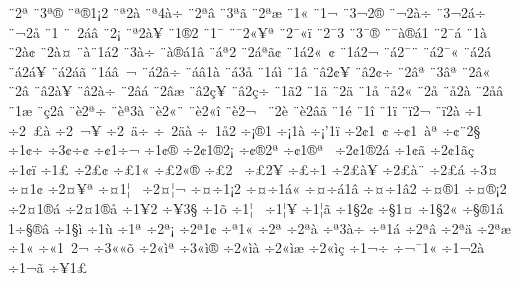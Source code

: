 {^^a82^^aa^^ad
^^a83^^aa^^ae
^^a8^^aa^^ae1^^a12
^^a8^^aa2^^e0
^^a8^^aa4^^e0^^f7
^^a82^^aa^^e2
^^a83^^aa^^e3
^^a82^^aa^^e6
^^a81^^ab
^^a81^^ac
^^a83^^ac2^^ad^^ae
^^a8^^ac2^^e0^^f7
^^a83^^ac2^^e1^^f7
^^a8^^ac2^^e5
^^a81^^ad
^^a8^^ad^^a02^^e1^^e2
^^a82^^ad^^a1
^^a8^^ad^^aa2^^e0^^a5
^^a81^^ae2
^^a81^^af
^^a8^^af2^^ab^^a5^^aa
^^a82^^af^^ab^^ef
^^a82^^af3^^ad
^^a83^^af^^ae
^^a8^^af^^e0^^ae^^e11
^^a82^^af^^e1
^^a81^^e0
^^a82^^e0^^a2
^^a82^^e0^^a4
^^a8^^e0^^a81^^e12
^^a83^^e0^^f7
^^a8^^e0^^ae^^e11^^e2
^^a8^^e1^^aa2
^^a82^^e1^^aa^^e3^^a2
^^a81^^e12^^ab^^a0^^a2
^^a81^^e12^^ac
^^a8^^e12^^af^^a8
^^a8^^e12^^af^^ab
^^a8^^e12^^e1^^a0
^^a8^^e12^^e1^^a5
^^a8^^e12^^e1^^e3
^^a81^^e1^^e2^^a0^^ac
^^a8^^e12^^e2^^f7^^ad
^^a8^^e1^^e21^^e0
^^a8^^e13^^e5
^^a81^^e1^^ec
^^a81^^e2
^^a8^^e22^^a2^^a5
^^a8^^e22^^a2^^f7
^^a82^^e2^^aa
^^a83^^e2^^aa^^ad
^^a82^^e2^^ab
^^a82^^e2^^ad
^^a8^^e22^^e0^^a5
^^a8^^e22^^e0^^f7
^^a82^^e2^^e1
^^a82^^e2^^e6
^^a8^^e22^^e7^^a5
^^a8^^e22^^e7^^f7
^^a81^^e32
^^a81^^e4
^^a82^^e4^^ad
^^a81^^e5
^^a8^^e52^^ab
^^a82^^e5^^ad
^^a8^^e52^^e0
^^a82^^e5^^e2
^^a81^^e6
^^a8^^e72^^e2
^^a8^^e82^^aa^^f7
^^a8^^e8^^aa3^^e0
^^a8^^e82^^ab^^a8
^^a8^^e82^^ab^^ee
^^a8^^e82^^ac^^a0
^^a82^^e8^^ad
^^a8^^e82^^e2^^e3
^^a81^^e9
^^a81^^ee
^^a81^^ef
^^a8^^ef2^^ac
^^a8^^ef2^^e0
^^f71^^a0
^^f72^^a0^^a3^^e0
^^f72^^a0^^ac^^a5
^^f72^^a0^^e4^^f7
^^f7^^a02^^e4^^e0
^^f7^^a01^^e52
^^f7^^a1^^ae1
^^f7^^a11^^e0
^^f7^^a1'1^^ef
^^f72^^a21^^a0^^a2
^^f7^^a21^^a0^^e0^^aa
^^f7^^a2^^a82^^a7
^^f71^^a2^^f7
^^f73^^a2^^f7^^a2
^^f7^^a21^^f7^^ac
^^f71^^a2^^ae
^^f72^^a21^^ae2^^a1
^^f7^^a2^^ae2^^aa
^^f7^^a21^^ae^^aa^^a0
^^f72^^a21^^ae2^^e1
^^f71^^a2^^e3
^^f72^^a21^^e3^^e7^^a0
^^f71^^a2^^ef
^^f71^^a3
^^f72^^a3^^a2
^^f7^^a31^^ab
^^f7^^a32^^ab^^ae
^^f7^^a32^^ad^^a0
^^f7^^a32^^ad^^a5
^^f7^^a3^^ad^^f71
^^f72^^a3^^e0^^a5
^^f72^^a3^^e0^^a8
^^f72^^a3^^e1
^^f73^^a4^^a0
^^f7^^a41^^a2
^^f72^^a4^^a5^^aa
^^f7^^a41^^a6^^a0
^^f72^^a4^^a6^^ac
^^f7^^a4^^f71^^a12
^^f7^^a4^^f71^^e1^^ab
^^f7^^a4^^f7^^e11^^e2
^^f7^^a4^^f71^^e22
^^f7^^a4^^ae1
^^f7^^a4^^ae^^a12
^^f72^^a41^^ae^^e1
^^f72^^a41^^ae^^e5
^^f71^^a52
^^f7^^a53^^a7
^^f71^^f5
^^f71^^a6^^a0
^^f71^^a6^^a5
^^f71^^a6^^e3
^^f71^^a72^^a2
^^f7^^a71^^a4
^^f71^^a72^^ab
^^f7^^a7^^ae1^^e1
1^^f7^^a7^^ae^^e2
^^f71^^a7^^ec
^^f71^^f9
^^f71^^aa
^^f72^^aa^^a1
^^f72^^aa1^^a2
^^f7^^aa1^^ab
^^f72^^aa^^ad
^^f72^^aa^^e0
^^f7^^aa3^^e0^^f7
^^f7^^aa1^^e1
^^f72^^aa^^e2
^^f72^^aa^^e4
^^f72^^aa^^e6
^^f71^^ab
^^f7^^ab1^^a02^^ac
^^f73^^ab^^ab^^f5
^^f72^^ab^^ec^^aa
^^f73^^ab^^ec^^ae
^^f72^^ab^^ec^^e0
^^f72^^ab^^ec^^e6
^^f72^^ab^^ec^^e7
^^f71^^ac^^f7
^^f7^^ac^^af1^^ab
^^f71^^ac2^^e0
^^f71^^ac^^e3
^^f7^^ad^^a51^^a3
}
